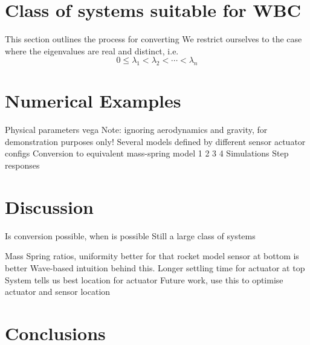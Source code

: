\documentclass{mbd_fullpaper}
\begin{document}
\section{Class of systems suitable for WBC}
This section outlines the process for converting
We restrict ourselves to the case where the eigenvalues are real and distinct, i.e.
\begin{equation}
0 \leq \lambda_1<\lambda_2< \cdots <\lambda_n
\label{eq:lambda}
\end{equation}


\section{Numerical Examples}
Physical parameters vega
Note: ignoring aerodynamics and gravity, for demonstration purposes only!
Several models defined by different sensor actuator configs
Conversion to equivalent mass-spring model
1
2
3
4
Simulations
Step responses

\section{Discussion}
Is conversion possible, when is possible
Still a large class of systems

Mass Spring ratios, uniformity better
for that rocket model sensor at bottom is better
Wave-based intuition behind this. Longer settling time for actuator at top
System tells us best location for actuator
Future work, use this to optimise actuator and sensor location

\section{Conclusions}




\end{document}
